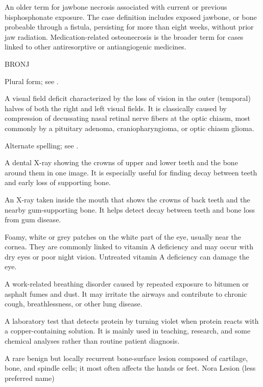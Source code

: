  An older term for
jawbone necrosis associated with current or previous bisphosphonate exposure.
The case definition includes exposed jawbone, or bone probeable through a
fistula, persisting for more than eight weeks, without prior jaw radiation.
Medication-related osteonecrosis is the broader term for cases linked to other
antiresorptive or antiangiogenic medicines.

\synonyms
BRONJ

 Plural form; see .

 A visual field deficit characterized by the loss of vision in the outer (temporal) halves of both the right and left visual fields. It is classically caused by compression of decussating nasal retinal nerve fibers at the optic chiasm, most commonly by a pituitary adenoma, craniopharyngioma, or optic chiasm glioma.

 Alternate spelling; see .

 A dental X-ray showing the crowns of upper and lower teeth and the bone around them in one image. It is especially useful for finding decay between teeth and early loss of supporting bone.

 An X-ray taken inside the mouth that shows the crowns of back teeth and the nearby gum-supporting bone. It helps detect decay between teeth and bone loss from gum disease.

 Foamy, white or grey patches on the white part of the eye, usually near the cornea. They are commonly linked to vitamin A deficiency and may occur with dry eyes or poor night vision. Untreated vitamin A deficiency can damage the eye.

 A work-related breathing disorder caused by repeated exposure to bitumen or asphalt fumes and dust. It may irritate the airways and contribute to chronic cough, breathlessness, or other lung disease.

 A laboratory test that detects protein by turning violet when protein reacts with a copper-containing solution. It is mainly used in teaching, research, and some chemical analyses rather than routine patient diagnosis.

 A rare benign but locally recurrent bone-surface lesion composed of cartilage, bone, and spindle cells; it most often affects the hands or feet.
\synonyms
Nora Lesion (less preferred name)

